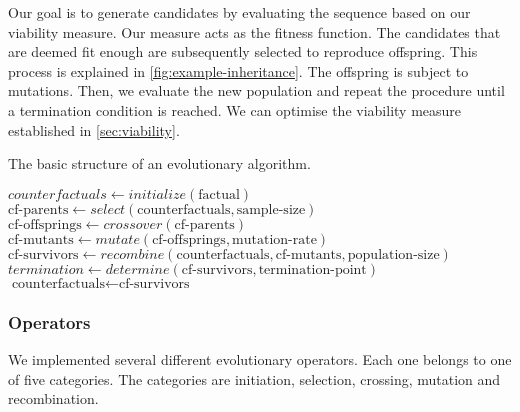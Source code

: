 \documentclass[./../../paper.tex]{subfiles}
\begin{document}
Our goal is to generate candidates by evaluating the sequence based on our viability measure. Our measure acts as the fitness function. The candidates that are deemed fit enough are subsequently selected to reproduce offspring. This process is explained in \autoref{fig:example-inheritance}. The offspring is subject to mutations. Then, we evaluate the new population and repeat the procedure until a termination condition is reached. We can optimise the viability measure established in \autoref{sec:viability}.

\newcommand{\cf}{\text{counterfactuals}}
\newcommand{\cfp}{\text{cf-parents}}
\newcommand{\cfo}{\text{cf-offsprings}}
\newcommand{\cfm}{\text{cf-mutants}}
\newcommand{\cfs}{\text{cf-survivors}}


\begin{algorithm}[htb!]
    \caption{The basic structure of an evolutionary algorithm.}
    \begin{algorithmic}

        \State $counterfactuals \gets initialize(\text{factual})$
        \State $\cfp \gets select(\cf, \text{sample-size})$
        \State $\cfo \gets crossover(\cfp) $
        \State $\cfm \gets mutate(\cfo, \text{mutation-rate})$
        \State $\cfs \gets recombine(\cf, \cfm, \text{population-size})$
        \State $termination \gets determine(\cfs, \text{termination-point})$
        \State $\cf \gets \cfs$
        \EndWhile
    \end{algorithmic}
    \label{alg:my-evolutionary}
\end{algorithm}

\subsubsection{Operators}
We implemented several different evolutionary operators. Each one belongs to one of five categories. The categories are initiation, selection, crossing, mutation and recombination.
\end{document}
